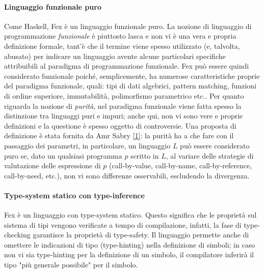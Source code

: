 \documentclass[10pt,a4paper]{article}
\begin{document}
\paragraph{Linguaggio funzionale puro}
Come Haskell, Fex è un linguaggio funzionale puro. La nozione di linguaggio
di programmazione \textit{funzionale} è piuttosto lasca e non vi è una vera e propria definizione formale,
tant'è che il termine viene spesso utilizzato (e, talvolta, abusato) per indicare un linguaggio avente alcune
particolari specifiche attribuibili al paradigma di programmazione funzionale. Fex può essere quindi considerato
funzionale poiché, semplicemente, ha numerose caratteristiche proprie del paradigma funzionale, quali: tipi di dati
algebrici, pattern matching, funzioni di ordine superiore, immutabilità, polimorfismo parametrico etc.. Per quanto
riguarda la nozione di \textit{purità}, nel paradigma funzionale viene fatta spesso la distinzione
tra linguaggi puri e impuri; anche qui, non vi sono vere e proprie definizioni e la questione è spesso oggetto di
controversie. Una proposta di definizione è stata fornita da Amr Sabry \hyperlink{bibl1}{[1]}: la purità ha a che
fare con il passaggio
dei parametri, in particolare, un linguaggio $ L $ può essere
considerato puro se, dato un qualsiasi programma $ p $ scritto in $ L $, al variare delle strategie di valutazione
delle espressione di $ p $ (call-by-value, call-by-name, call-by-reference, call-by-need, etc.), non vi sono differenze
osservabili, escludendo la divergenza.

\paragraph{Type-system statico con type-inference}
Fex è un linguaggio con type-system statico. Questo significa che le proprietà sul sistema di tipi vengono verificate
a tempo di compilazione, infatti, la fase di
type-checking garantisce la proprietà di type-safety. Il linguaggio permette anche di omettere le indicazioni di
tipo (type-hinting) nella definizione di simboli; in caso non vi sia type-hinting per la definizione di un simbolo,
il compilatore inferirà il tipo "più generale possibile" per il simbolo.
\end{document}
